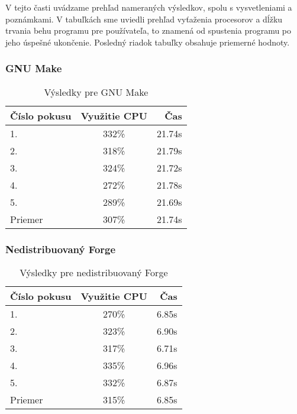 V tejto časti uvádzame prehľad nameraných výsledkov, spolu s vysvetleniami a poznámkami.
V tabuľkách sme uviedli prehľad vyťaženia procesorov a dĺžku trvania behu programu pre používateľa,
to znamená od spustenia programu po jeho úspešné ukončenie. Posledný riadok tabuľky obsahuje
priemerné hodnoty.

\subsubsection{GNU Make}
\label{sec:results:make}

\begin{table}[H]
  \centering
  \begin{tabular}{| l || c | r |}
    \hline
    \v{C}\'{i}slo pokusu & Vyu\v{z}itie CPU & \v{C}as \\ \hline \hline
    1. & 332\% & 21.74s \\ \hline
    2. & 318\% & 21.79s \\ \hline
    3. & 324\% & 21.72s \\ \hline
    4. & 272\% & 21.78s \\ \hline
    5. & 289\% & 21.69s \\ \hline \hline
    Priemer & 307\% & 21.74s \\
    \hline
  \end{tabular}
  \caption{V\'{y}sledky pre GNU Make}
  \label{tbl:make}
\end{table}

\subsubsection{Nedistribuovan\'{y} Forge}
\label{sec:results:forgelocal}

\begin{table}[H]
  \centering
  \begin{tabular}{| l || c | r |}
    \hline
    \v{C}\'{i}slo pokusu & Vyu\v{z}itie CPU & \v{C}as \\ \hline \hline
    1. & 270\% & 6.85s \\ \hline
    2. & 323\% & 6.90s \\ \hline
    3. & 317\% & 6.71s \\ \hline
    4. & 335\% & 6.96s \\ \hline
    5. & 332\% & 6.87s \\ \hline \hline
    Priemer & 315\% & 6.85s \\
    \hline
  \end{tabular}
  \caption{V\'{y}sledky pre nedistribuovan\'{y} Forge}
  \label{tbl:forgelocal}
\end{table}

